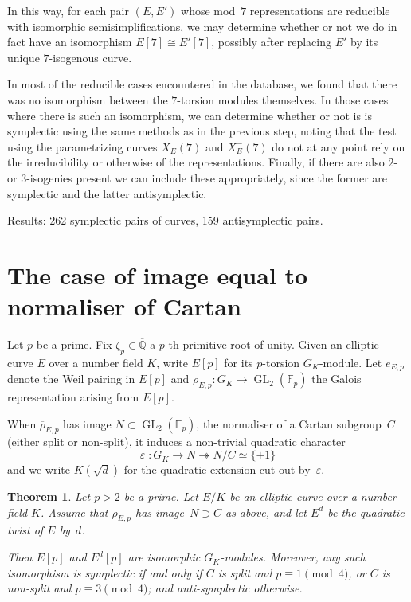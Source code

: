 \documentclass[12pt]{amsart}
\newcommand{\F}{\mathbb{F}}
\newcommand{\Q}{\mathbb{Q}}
\newcommand{\Qbar}{{\overline{\Q}}}
\newcommand{\rhobar}{{\overline{\rho}}}
\newcommand{\eps}{\varepsilon}
\newcommand{\GL}{\operatorname{GL}}
\numberwithin{equation}{section}
\newtheorem{theorem}{Theorem}[section]
\theoremstyle{definition}
\theoremstyle{remark}
\begin{document}
In this way, for each pair $(E,E')$ whose 
mod~$7$ representations
are reducible with isomorphic semisimplifications, we may determine
whether or not we do in fact have an isomorphism $E[7]\cong E'[7]$,
possibly after replacing $E'$ by its unique $7$-isogenous curve.

In most of the reducible cases encountered in the database, we found
that there was no isomorphism between the $7$-torsion modules
themselves.  In those cases where there is such an isomorphism, we can
determine whether or not is is symplectic using the same methods as in
the previous step, noting that the test using the parametrizing curves
$X_E(7)$ and $X_E^-(7)$ do not at any point rely on the irreducibility
or otherwise of the representations.  Finally, if there are also
$2$-{} or $3$-isogenies present we can include these appropriately,
since the former are symplectic and the latter antisymplectic.

Results: 262 symplectic pairs of curves, 159 antisymplectic pairs.

\section{The case of image equal to normaliser of Cartan}

Let $p$ be a prime. Fix $\zeta_p \in \Qbar$ a $p$-th primitive root of
unity.  Given an elliptic curve $E$ over a number field $K$, write
$E[p]$ for its $p$-torsion $G_K$-module. Let $e_{E,p}$ denote the Weil
pairing in $E[p]$ and $\rhobar_{E,p} : G_K \to \GL_2(\F_p)$ the Galois
representation arising from $E[p]$.

When $\rhobar_{E,p}$ has image $N \subset \GL_2(\F_p)$, the normaliser
of a Cartan subgroup~$C$ (either split or non-split), it induces a
non-trivial quadratic character
\[
 \eps \; : G_K \to N \twoheadrightarrow N/C \simeq \{\pm 1 \}
\]
and we write $K(\sqrt{d})$ for the quadratic extension cut out
by~$\eps$.

\begin{theorem} \label{T:Cartan}
Let $p > 2$ be a prime. Let $E/K$ be an elliptic curve 
over a number field $K$. Assume that $\rhobar_{E,p}$ has image~$N
\supset C$ as above, and let $E^d$ be the quadratic twist of $E$
by~$d$.

Then $E[p]$ and $E^d[p]$ are isomorphic $G_K$-modules. Moreover, any
such isomorphism is symplectic if and only if $C$ is split and $p
\equiv 1 \pmod{4}$, or $C$ is non-split and $p \equiv 3 \pmod{4}$; and
anti-symplectic otherwise.
\end{theorem}
\end{document}

